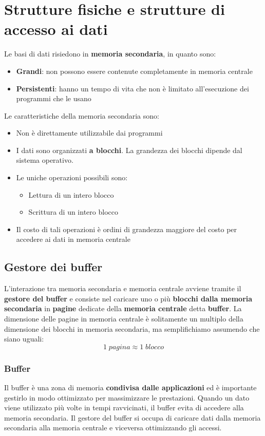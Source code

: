 \documentclass[a4paper]{article}
\begin{document}
\section{Strutture fisiche e strutture di accesso ai dati}
Le basi di dati risiedono in \textbf{memoria secondaria}, in quanto sono:
\begin{itemize}
  \item \textbf{Grandi}: non possono essere contenute completamente in memoria centrale
  \item \textbf{Persistenti}: hanno un tempo di vita che non è limitato all'esecuzione
    dei programmi che le usano
\end{itemize}
Le caratteristiche della memoria secondaria sono:
\begin{itemize}
  \item Non è direttamente utilizzabile dai programmi

  \item I dati sono organizzati \textbf{a blocchi}. La grandezza dei
    blocchi dipende dal sistema operativo.

  \item Le uniche operazioni possibili sono:
    \begin{itemize}
      \item Lettura di un intero blocco
      \item Scrittura di un intero blocco
    \end{itemize}

  \item Il costo di tali operazioni è ordini di grandezza maggiore del costo per
    accedere ai dati in memoria centrale
\end{itemize}

\subsection{Gestore dei buffer}
L'interazione tra memoria secondaria e memoria centrale avviene tramite il
\textbf{gestore del buffer} e consiste nel caricare uno o più \textbf{blocchi
dalla memoria secondaria} in \textbf{pagine} dedicate della \textbf{memoria centrale}
detta \textbf{buffer}. La dimensione delle pagine in memoria centrale è solitamente
un multiplo della dimensione dei blocchi in memoria secondaria, ma semplifichiamo
assumendo che siano uguali:
\[
  1\; pagina \approx 1\; blocco
\] 

\subsubsection{Buffer}
Il buffer è una zona di memoria \textbf{condivisa dalle applicazioni} ed è importante
gestirlo in modo ottimizzato per massimizzare le prestazioni. Quando un dato viene
utilizzato più volte in tempi ravvicinati, il buffer evita di accedere alla memoria
secondaria. Il gestore del buffer si occupa di caricare dati dalla memoria secondaria
alla memoria centrale e viceversa ottimizzando gli accessi.
\end{document}
